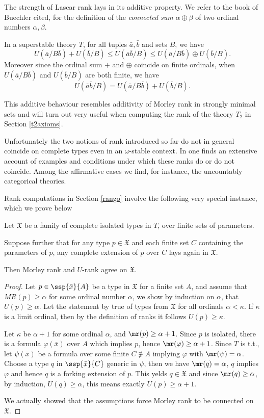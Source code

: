 \smallskip
The strength of Lascar rank lays in its additive property. We refer to the book
of Buechler cited, for the definition of the {\em connected sum} $\alpha\oplus\beta$ of two ordinal numbers
$\alpha,\beta$.
\begin{fact}\label{uddi}
In a superstable theory $T$, for all tuples $\bar a,\bar b$ and sets $B$, we have
$$
U(\bar a/B\bar b)+U(\bar b/B)\leq U(\bar a\bar b/B)\leq U(\bar a/B\bar b)\oplus U(\bar b/B).$$
Moreover since the ordinal sum $+$ and $\oplus$ coincide on finite ordinals, when
$U(\bar a/B\bar b)$ and $U(\bar b/B)$ are both finite, we have
$$
U(\bar a\bar b/B)=U(\bar a/B\bar b)+U(\bar b/B).
$$
\end{fact}
This additive behaviour resembles additivity of Morley rank in strongly minimal sets and will turn out
very useful when computing the rank of the theory $T_{2}$ in Section \ref{t2axioms}.

Unfortunately the two notions of rank introduced so far do not in general coincide on complete types even in
an $\omega$-stable context.  In \cite[\S6 and \S7]{bue} one finds an extensive account of 
examples and conditions under which these ranks do or do not coincide. Among the affirmative cases we find, for instance, the
uncountably categorical theories.

Rank computations in Section \ref{rango} involve the following very special instance, which we prove below
\begin{lem}\label{RMU}
Let $\mathfrak{X}$ be a family of complete isolated types in $T$, %
over finite sets of parameters.

Suppose further that for any type $p\in\mathfrak{X}$ and each finite set $C$ containing the parameters of $p$,
any complete extension of $p$ over $C$ lays again in ${\mathfrak X}$.

Then Morley rank and $U$-rank agree on $\mathfrak{X}$.
\end{lem}
\begin{proof}
Let $p\in\ssp{\bar x}{A}$ be a type in $\mathfrak{X}$ for a finite set $A$, and assume that $M\!R(p)\geq\alpha$ for some ordinal number $\alpha$, we show
by induction on $\alpha$, that $U(p)\geq\alpha$. Let the statement by true of types from ${\mathfrak X}$
for all ordinals $\alpha<\kappa$. If $\kappa$ is a limit
ordinal, then by the definition of ranks it follows $U(p)\geq\kappa$.

Let $\kappa$ be $\alpha+1$ for some ordinal $\alpha$, and $\mr(p)\geq\alpha+1$. Since $p$ is isolated, there is a formula
$\varphi(\bar x)$ over $A$ which implies $p$, hence $\mr(\varphi)\geq\alpha+1$. Since $T$ is t.t., let $\psi(\bar x)$ be a formula
over some finite $C\nni A$ implying $\varphi$ with $\mr(\psi)=\alpha$. Choose a type $q$ in $\ssp{\bar x}{C}$ generic
in $\psi$, then we have $\mr(q)=\alpha$, $q$ implies $\varphi$ and hence $q$ is a forking extension of $p$.
This yelds $q\in\mathfrak{X}$ and
since $\mr(q)\geq\alpha$, by induction, $U(q)\geq\alpha$, this means exactly $U(p)\geq\alpha+1$.

We actually showed that the assumptions force Morley rank to be connected on ${\mathfrak X}$.
\end{proof}

